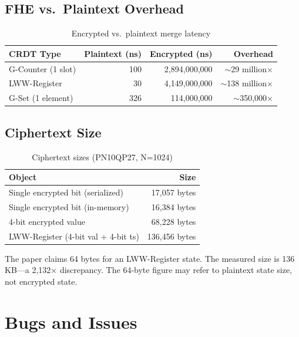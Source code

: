 \documentclass{fhe-shared/luxfhe}
\begin{document}
\subsection{FHE vs.\ Plaintext Overhead}

\begin{table}[h]
\centering
\caption{Encrypted vs.\ plaintext merge latency}
\label{tab:overhead}
\begin{tabular}{lrrr}
\toprule
CRDT Type & Plaintext (ns) & Encrypted (ns) & Overhead \\
\midrule
G-Counter (1 slot) & 100       & 2,894,000,000     & $\sim$29 million$\times$ \\
LWW-Register       & 30        & 4,149,000,000     & $\sim$138 million$\times$ \\
G-Set (1 element)  & 326       & 114,000,000       & $\sim$350,000$\times$ \\
\bottomrule
\end{tabular}
\end{table}

\subsection{Ciphertext Size}

\begin{table}[h]
\centering
\caption{Ciphertext sizes (PN10QP27, N=1024)}
\label{tab:sizes}
\begin{tabular}{lr}
\toprule
Object & Size \\
\midrule
Single encrypted bit (serialized) & 17,057 bytes \\
Single encrypted bit (in-memory)  & 16,384 bytes \\
4-bit encrypted value             & 68,228 bytes \\
LWW-Register (4-bit val + 4-bit ts) & 136,456 bytes \\
\bottomrule
\end{tabular}
\end{table}

The paper claims 64 bytes for an LWW-Register state.  The measured
size is 136 KB---a 2,132$\times$ discrepancy.  The 64-byte figure
may refer to plaintext state size, not encrypted state.

\section{Bugs and Issues}
\end{document}
